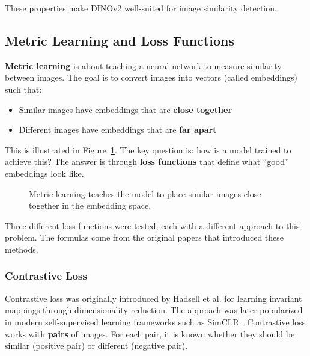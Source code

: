 \documentclass[
    english,
]{VUMIFPSbakalaurinis}
\begin{document}
These properties make DINOv2 well-suited for image similarity detection.

\subsection{Metric Learning and Loss Functions}

\textbf{Metric learning} is about teaching a neural network to measure similarity between images. The goal is to convert images into vectors (called embeddings) such that:
\begin{itemize}
    \item Similar images have embeddings that are \textbf{close together}
    \item Different images have embeddings that are \textbf{far apart}
\end{itemize}

This is illustrated in Figure~\ref{fig:metric_learning}. The key question is: how is a model trained to achieve this? The answer is through \textbf{loss functions} that define what \enquote{good} embeddings look like.

\begin{figure}[H]
\centering
{}
\caption{Metric learning teaches the model to place similar images close together in the embedding space.}
\label{fig:metric_learning}
\end{figure}

Three different loss functions were tested, each with a different approach to this problem. The formulas come from the original papers that introduced these methods.

\subsubsection{Contrastive Loss}

Contrastive loss was originally introduced by Hadsell et al. \cite{Had06} for learning invariant mappings through dimensionality reduction. The approach was later popularized in modern self-supervised learning frameworks such as SimCLR \cite{Che20}. Contrastive loss works with \textbf{pairs} of images. For each pair, it is known whether they should be similar (positive pair) or different (negative pair).
\end{document}
